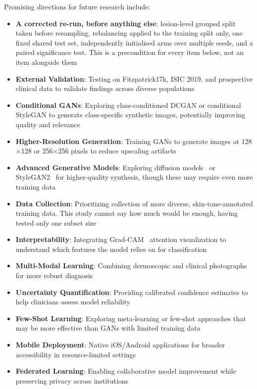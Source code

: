 \documentclass[ai,article,submit,pdftex,moreauthors]{Definitions/mdpi}
\begin{document}
Promising directions for future research include:
\begin{itemize}[leftmargin=*, itemsep=2pt]
    \item \textbf{A corrected re-run, before anything else}: lesion-level grouped split taken before resampling, rebalancing applied to the training split only, one fixed shared test set, independently initialised arms over multiple seeds, and a paired significance test. This is a precondition for every item below, not an item alongside them
    \item \textbf{External Validation}: Testing on Fitzpatrick17k, ISIC 2019, and prospective clinical data to validate findings across diverse populations
    \item \textbf{Conditional GANs}: Exploring class-conditioned DCGAN or conditional StyleGAN to generate class-specific synthetic images, potentially improving quality and relevance
    \item \textbf{Higher-Resolution Generation}: Training GANs to generate images at 128$\times$128 or 256$\times$256 pixels to reduce upscaling artifacts
    \item \textbf{Advanced Generative Models}: Exploring diffusion models~\cite{ho2020} or StyleGAN2~\cite{karras2020} for higher-quality synthesis, though these may require even more training data
    \item \textbf{Data Collection}: Prioritizing collection of more diverse, skin-tone-annotated training data. This study cannot say how much would be enough, having tested only one subset size
    \item \textbf{Interpretability}: Integrating Grad-CAM~\cite{selvaraju2017} attention visualization to understand which features the model relies on for classification
    \item \textbf{Multi-Modal Learning}: Combining dermoscopic and clinical photographs for more robust diagnosis
    \item \textbf{Uncertainty Quantification}: Providing calibrated confidence estimates to help clinicians assess model reliability
    \item \textbf{Few-Shot Learning}: Exploring meta-learning or few-shot approaches that may be more effective than GANs with limited training data
    \item \textbf{Mobile Deployment}: Native iOS/Android applications for broader accessibility in resource-limited settings
    \item \textbf{Federated Learning}: Enabling collaborative model improvement while preserving privacy across institutions
\end{itemize}
\end{document}
